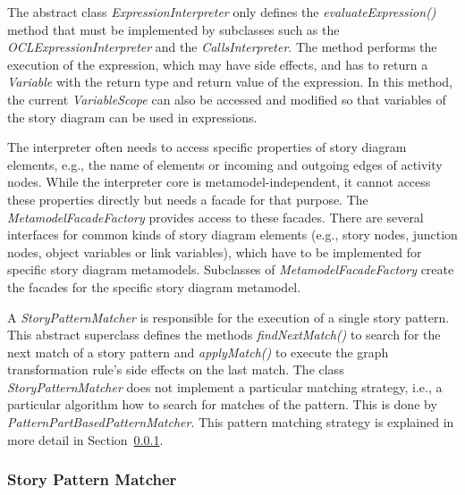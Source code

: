 The abstract class \emph{ExpressionInterpreter} only defines the \emph{evaluateExpression()} method that must be implemented by subclasses such as the \emph{OCLExpressionInterpreter} and the \emph{CallsInterpreter}. 
The method performs the execution of the expression, which may have side effects, and has to return a \emph{Variable} with the return type and return value of the expression. 
In this method, the current \emph{VariableScope} can also be accessed and modified so that variables of the story diagram can be used in expressions.

The interpreter often needs to access specific properties of story diagram elements, e.g., the name of elements or incoming and outgoing edges of activity nodes.
While the interpreter core is metamodel-independent, it cannot access these properties directly but needs a facade for that purpose.
The \emph{MetamodelFacadeFactory} provides access to these facades. 
There are several interfaces for common kinds of story diagram elements (e.g., story nodes, junction nodes, object variables or link variables), which have to be implemented for specific story diagram metamodels.
Subclasses of \emph{MetamodelFacadeFactory} create the facades for the specific story diagram metamodel.

A \emph{StoryPatternMatcher} is responsible for the execution of a single story pattern. 
This abstract superclass defines the methods \emph{findNextMatch()} to search for the next match of a story pattern and \emph{applyMatch()} to execute the graph transformation rule's side effects on the last match. 
The class \emph{StoryPatternMatcher} does not implement a particular matching strategy, i.e., a particular algorithm how to search for matches of the pattern. 
This is done by \emph{PatternPartBasedPatternMatcher}. 
This pattern matching strategy is explained in more detail in Section~\ref{sec:story_pattern_matcher}. 


\subsubsection{Story Pattern Matcher}
\label{sec:story_pattern_matcher}

